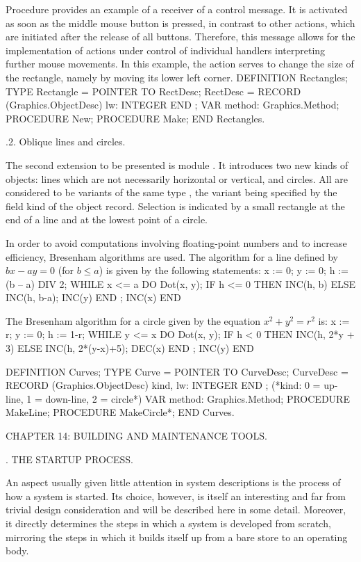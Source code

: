 Procedure  provides an example of a receiver of a control message. It is activated as soon as the middle mouse button is pressed, in contrast to other actions, which are initiated after the release of all buttons. Therefore, this message allows for the implementation of actions under control of individual handlers interpreting further mouse movements. In this example, the action serves to change the size of the rectangle, namely by moving its lower left corner.
\begintt
DEFINITION Rectangles;
  TYPE Rectangle = POINTER TO RectDesc;
    RectDesc = RECORD (Graphics.ObjectDesc) lw: INTEGER
    END ;
  VAR method: Graphics.Method;
  PROCEDURE New;
  PROCEDURE Make;
END Rectangles.
\endtt

.2. Oblique lines and circles.

The second extension to be presented is module . It introduces two new kinds of objects: lines which are not necessarily horizontal or vertical, and circles. All are considered to be variants of the same type , the variant being specified by the field kind of the object record. Selection is indicated by a small rectangle at the end of a line and at the lowest point of a circle.

In order to avoid computations involving floating-point numbers and to increase efficiency, Bresenham algorithms are used. The algorithm for a line defined by $bx - ay = 0$ (for $b \le a$) is given by the following statements:
\begintt
x := 0; y := 0; h := (b – a) DIV 2;
WHILE x <= a DO Dot(x, y);
  IF h <= 0 THEN INC(h, b) ELSE INC(h, b-a); INC(y) END ;
  INC(x)
END
\endtt

The Bresenham algorithm for a circle given by the equation $x^2 + y^2 = r^2$ is:
\begintt
x := r; y := 0; h := 1-r;
WHILE y <= x DO Dot(x, y);
  IF h < 0 THEN INC(h, 2*y + 3) ELSE INC(h, 2*(y-x)+5); DEC(x) END ;
  INC(y)
END

DEFINITION Curves;
  TYPE Curve = POINTER TO CurveDesc;
    CurveDesc = RECORD (Graphics.ObjectDesc)
                  kind, lw: INTEGER
                END ;
(*kind: 0 = up-line, 1 = down-line, 2 = circle*)
VAR method: Graphics.Method;
PROCEDURE MakeLine;
PROCEDURE MakeCircle*;
END Curves.
\endtt

\beginchapter CHAPTER 14: BUILDING AND MAINTENANCE TOOLS.

. THE STARTUP PROCESS.

An aspect usually given little attention in system descriptions is the process of how a system is started. Its choice, however, is itself an interesting and far from trivial design consideration and will be described here in some detail. Moreover, it directly determines the steps in which a system is developed from scratch, mirroring the steps in which it builds itself up from a bare store to an operating body.

